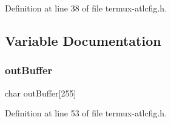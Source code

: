Definition at line 38 of file termux-\/atlcfig.\+h.



\subsection{Variable Documentation}
\mbox{\label{termux-atlcfig_8h_a2f25dee1596892b07e30dd78f5ebe81b}} 
\subsubsection{\texorpdfstring{out\+Buffer}{outBuffer}}
{\footnotesize\ttfamily char out\+Buffer\mbox{[}255\mbox{]}}



Definition at line 53 of file termux-\/atlcfig.\+h.

